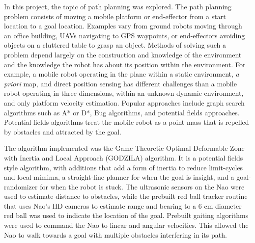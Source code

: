 In this project, the topic of path planning was explored.
The path planning problem consists of moving a mobile platform or end-effector from a start location to a goal location.
Examples vary from ground robots moving through an office building, UAVs navigating to GPS waypoints, or end-effectors avoiding objects on a cluttered table to grasp an object.
Methods of solving such a problem depend largely on the construction and knowledge of the environment and the knowledge the robot has about its position within the environment. For example, a mobile robot operating in the plane within a static environment, \textit{a priori} map, and direct position sensing has different challenges than a mobile robot operating in three-dimensions, within an unknown dynamic environment, and only platform velocity estimation.
Popular approaches include graph search algorithms such as A* or D*, Bug algorithms, and potential fields approaches. Potential fields algorithms treat the mobile robot as a point mass that is repelled by obstacles and attracted by the goal. 

The algorithm implemented was the Game-Theoretic Optimal Deformable Zone with Inertia and Local Approach (GODZILA) algorithm. It is a potential fields style algorithm, with additions that add a form of inertia to reduce limit-cycles and local mimima, a straight-line planner for when the goal is insight, and a goal-randomizer for when the robot is stuck. The ultrasonic sensors on the Nao were used to estimate distance to obstacles, while the prebuilt red ball tracker routine that uses Nao's HD cameras to estimate range and bearing to a 6 cm diameter red ball was used to indicate the location of the goal. Prebuilt gaiting algorithms were used to command the Nao to linear and angular velocities. This allowed the Nao to walk towards a goal with multiple obstacles interfering in its path.

